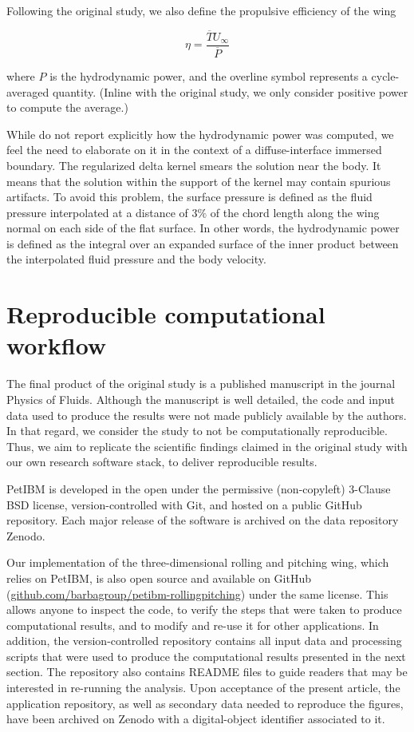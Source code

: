 Following the original study, we also define the propulsive efficiency of the wing

\begin{equation}
  \eta = \frac{\overline{T} U_\infty}{\overline{P}}
\end{equation}

where $P$ is the hydrodynamic power, and the overline symbol represents a cycle-averaged quantity.
(Inline with the original study, we only consider positive power to compute the average.)

While \citet{li_dong_2016} do not report explicitly how the hydrodynamic power was computed, we feel the need to elaborate on it in the context of a diffuse-interface immersed boundary.
The regularized delta kernel smears the solution near the body.
It means that the solution within the support of the kernel may contain spurious artifacts.
To avoid this problem, the surface pressure is defined as the fluid pressure interpolated at a distance of $3\%$ of the chord length along the wing normal on each side of the flat surface.
In other words, the hydrodynamic power is defined as the integral over an expanded surface of the inner product between the interpolated fluid pressure and the body velocity.

\section{Reproducible computational workflow}

The final product of the original study is a published manuscript in the journal Physics of Fluids.
Although the manuscript is well detailed, the code and input data used to produce the results were not made publicly available by the authors.
In that regard, we consider the study to not be computationally reproducible.
Thus, we aim to replicate the scientific findings claimed in the original study with our own research software stack, to deliver reproducible results.

PetIBM\supercite{chuang_et_al_2018} is developed in the open under the permissive (non-copyleft) 3-Clause BSD license, version-controlled with Git, and hosted on a public GitHub repository.
Each major release of the software is archived on the data repository Zenodo.

Our implementation of the three-dimensional rolling and pitching wing, which relies on PetIBM, is also open source and available on GitHub (\url{github.com/barbagroup/petibm-rollingpitching}) under the same license.
This allows anyone to inspect the code, to verify the steps that were taken to produce computational results, and to modify and re-use it for other applications.
In addition, the version-controlled repository contains all input data and processing scripts that were used to produce the computational results presented in the next section.
The repository also contains \textsc{README} files to guide readers that may be interested in re-running the analysis.
Upon acceptance of the present article, the application repository, as well as secondary data needed to reproduce the figures, have been archived on Zenodo with a digital-object identifier associated to it.

